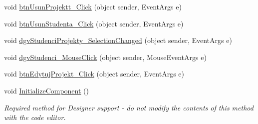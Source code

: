 \begin{DoxyCompactItemize}
\item 
void \hyperlink{class_dziennik_ocen_1_1_form_prowadzacy_abd8f5d37f95c980ea2d993ff2fdaac55}{btn\+Usun\+Projektt\+\_\+\+Click} (object sender, Event\+Args e)
\item 
void \hyperlink{class_dziennik_ocen_1_1_form_prowadzacy_aadb5dd637e2bea7b63d69e16a8ee8c50}{btn\+Usun\+Studenta\+\_\+\+Click} (object sender, Event\+Args e)
\item 
void \hyperlink{class_dziennik_ocen_1_1_form_prowadzacy_a3947fae964426bffb87f3dde229681f4}{dgv\+Studenci\+Projekty\+\_\+\+Selection\+Changed} (object sender, Event\+Args e)
\item 
void \hyperlink{class_dziennik_ocen_1_1_form_prowadzacy_acbf83dbd039b578f4e66d933668f50f1}{dgv\+Studenci\+\_\+\+Mouse\+Click} (object sender, Mouse\+Event\+Args e)
\item 
void \hyperlink{class_dziennik_ocen_1_1_form_prowadzacy_a74ec7d96eb8beeaddad0fed8f7fcbc8c}{btn\+Edytuj\+Projekt\+\_\+\+Click} (object sender, Event\+Args e)
\item 
void \hyperlink{class_dziennik_ocen_1_1_form_prowadzacy_a94e3e380b95874b6f037c44d2d514677}{Initialize\+Component} ()
\begin{DoxyCompactList}\small\item\em Required method for Designer support -\/ do not modify the contents of this method with the code editor. \end{DoxyCompactList}\end{DoxyCompactItemize}
